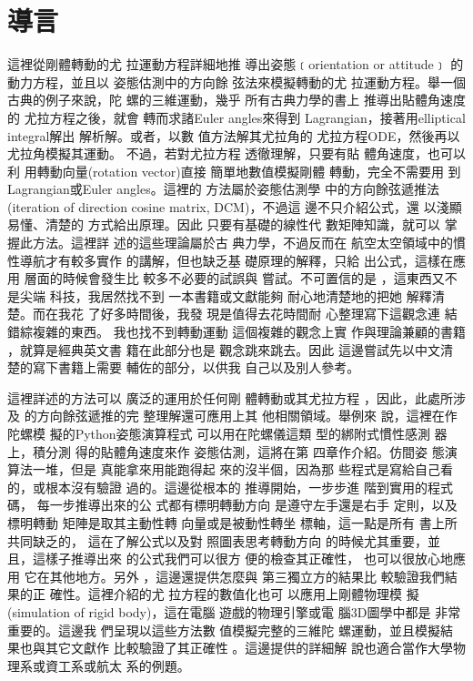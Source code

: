 \documentclass{article}
\begin{document}
 

\part{導言\protect\bigskip}

這裡從剛體轉動的尤%
拉運動方程詳細地推%
導出姿態﹝orientation or attitude﹞%
的動力方程，並且以%
姿態估測中的方向餘%
弦法來模擬轉動的尤%
拉運動方程。舉一個%
古典的例子來說，陀%
螺的三維運動，幾乎%
所有古典力學的書上%
推導出貼體角速度的%
尤拉方程之後，就會%
轉而求諸Euler angles來得到%
Lagrangian，接著用elliptical integral解出%
解析解。或者，以數%
值方法解其尤拉角的%
尤拉方程ODE，然後再以%
尤拉角模擬其運動。%
不過，若對尤拉方程%
透徹理解，只要有貼%
體角速度，也可以利%
用轉動向量(rotation vector)直接%
簡單地數值模擬剛體%
轉動，完全不需要用%
到Lagrangian或Euler angles。這裡的%
方法屬於姿態估測學%
中的方向餘弦遞推法%
(iteration of direction cosine matrix, DCM)，不過這%
邊不只介紹公式，還%
以淺顯易懂、清楚的%
方式給出原理。因此%
只要有基礎的線性代%
數矩陣知識，就可以%
掌握此方法。這裡詳%
述的這些理論屬於古%
典力學，不過反而在%
航空太空領域中的慣%
性導航才有較多實作%
的講解，但也缺乏基%
礎原理的解釋，只給%
出公式，這樣在應用%
層面的時候會發生比%
較多不必要的試誤與%
嘗試。不可置信的是%
，這東西又不是尖端%
科技，我居然找不到%
一本書籍或文獻能夠%
耐心地清楚地的把她%
解釋清楚。而在我花%
了好多時間後，我發%
現是值得去花時間耐%
心整理寫下這觀念連%
結錯綜複雜的東西。%
我也找不到轉動運動%
這個複雜的觀念上實%
作與理論兼顧的書籍%
，就算是經典英文書%
籍\cite{goldstein}在此部分也是%
觀念跳來跳去。因此%
這邊嘗試先以中文清%
楚的寫下書籍上需要%
輔佐的部分，以供我%
自己以及別人參考。

這裡詳述的方法可以%
廣泛的運用於任何剛%
體轉動或其尤拉方程%
，因此，此處所涉及%
的方向餘弦遞推的完%
整理解還可應用上其%
他相關領域。舉例來%
說，這裡在作陀螺模%
擬的Python姿態演算程式%
可以用在陀螺儀這類%
型的綁附式慣性感測%
器\cite[Ch 3.6.4]{titterton}上，積分測%
得的貼體角速度來作%
姿態估測，這將在第%
四章作介紹。仿間姿%
態演算法一堆，但是%
真能拿來用能跑得起%
來的沒半個，因為那%
些程式是寫給自己看%
的，或根本沒有驗證%
過的。這邊從根本的%
推導開始，一步步進%
階到實用的程式碼，%
每一步推導出來的公%
式都有標明轉動方向%
是遵守左手還是右手%
定則，以及標明轉動%
矩陣是取其主動性轉%
向量或是被動性轉坐%
標軸，這一點是所有%
書上所共同缺乏的，%
這在了解公式以及對%
照圖表思考轉動方向%
的時候尤其重要，並%
且，這樣子推導出來%
的公式我們可以很方%
便的檢查其正確性，%
也可以很放心地應用%
它在其他地方。另外%
，這邊還提供怎麼與%
第三獨立方的結果比%
較驗證我們結果的正%
確性。這裡介紹的尤%
拉方程的數值化也可%
以應用上剛體物理模%
擬(simulation of rigid body)，這在電腦%
遊戲的物理引擎或電%
腦3D圖學\cite[Ch 2.3]{pixarnote}中都是%
非常重要的。這邊我%
們呈現以這些方法數%
值模擬完整的三維陀%
螺運動，並且模擬結%
果也與其它文獻\cite{hasbun}作%
比較驗證了其正確性%
。這邊提供的詳細解%
說也適合當作大學物%
理系或資工系或航太%
系的例題。
\end{document}
